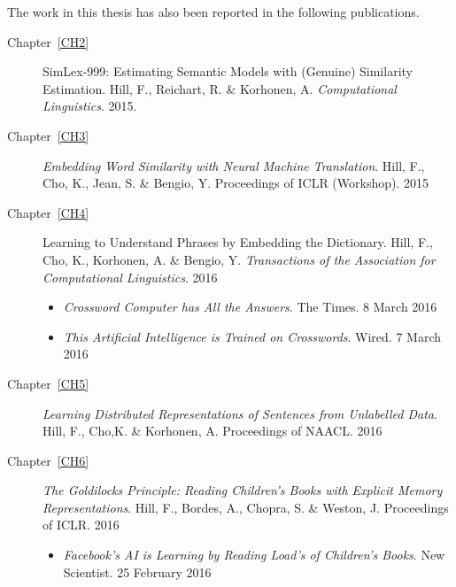 
The work in this thesis has also been reported in the following publications. 

\begin{description}

\item[Chapter~\ref{CH2}] SimLex-999: Estimating Semantic Models with (Genuine) Similarity Estimation. Hill, F., Reichart, R. \& Korhonen, A. \emph{Computational Linguistics}. 2015.
\item[Chapter~\ref{CH3}] \emph{Embedding Word Similarity with Neural Machine Translation}. Hill, F., Cho, K., Jean, S. \& Bengio, Y. Proceedings of ICLR (Workshop). 2015 
\item[Chapter~\ref{CH4}] Learning to Understand Phrases by Embedding the Dictionary. Hill, F., Cho, K., Korhonen, A. \& Bengio, Y. \emph{Transactions of the Association for Computational Linguistics}. 2016
\begin{itemize}
\item \emph{Crossword Computer has All the Answers}. The Times. 8 March 2016
\item  \emph{This Artificial Intelligence is Trained on Crosswords}. Wired. 7 March 2016
\end{itemize}
\item[Chapter~\ref{CH5}] \emph{Learning Distributed Representations of Sentences from Unlabelled Data}. Hill, F., Cho,K. \& Korhonen, A. Proceedings of NAACL. 2016
\item[Chapter~\ref{CH6}] \emph{The Goldilocks Principle: Reading Children's Books with Explicit Memory Representations}. Hill, F., Bordes, A., Chopra, S. \& Weston, J. Proceedings of ICLR. 2016
\begin{itemize}
\item \emph{Facebook's AI is Learning by Reading Load's of Children's Books}. New Scientist. 25 February 2016
\end{itemize}

\end{description}